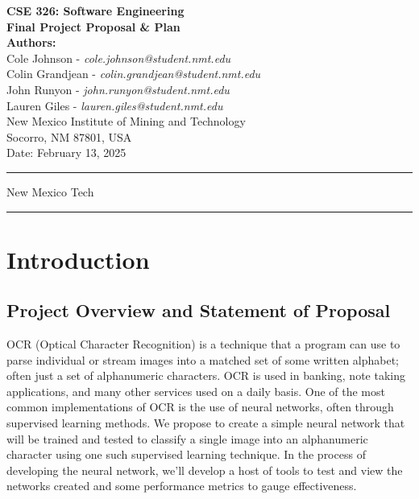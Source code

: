 \documentclass[english,12pt]{article}
\begin{document}
\begin{titlepage}
    \null
    \vspace*{2cm}
    
    \begin{center}
        {\Huge \bfseries CSE 326: Software Engineering}\\[1.5cm]
        {\Large \bfseries Final Project Proposal \& Plan}\\[2cm]
        
        \textbf{Authors:} \\[0.5cm]
        Cole Johnson - \textit{cole.johnson@student.nmt.edu}\\
        Colin Grandjean - \textit{colin.grandjean@student.nmt.edu}\\
        John Runyon - \textit{john.runyon@student.nmt.edu}\\
        Lauren Giles - \textit{lauren.giles@student.nmt.edu}\\[1cm]
        
        New Mexico Institute of Mining and Technology\\
        Socorro, NM 87801, USA\\[2cm]
        
        {\large Date: February 13, 2025}
    \end{center}
    
    \vfill
    \hrule
    \smallskip
    \centerline{\sc New Mexico Tech}
    \smallskip
    \hrule
\end{titlepage}

{\tableofcontents} 
\pagebreak
\section{Introduction}

\subsection{Project Overview and Statement of Proposal}
OCR (Optical Character Recognition) is a technique that a program can use to 
parse individual or stream images into a matched set of some written alphabet; 
often just a set of alphanumeric characters. 
OCR is used in banking, note taking applications,
 and many other services used on a daily basis. 
One of the most common implementations of OCR is the use of neural networks, 
often through supervised learning methods. 
We propose to create a simple neural network that will be trained and tested 
to classify a single image into an alphanumeric character 
using one such supervised learning technique. 
In the process of developing the neural network, 
we'll develop a host of tools to test and 
view the networks created and some performance metrics to gauge effectiveness.
\end{document}
